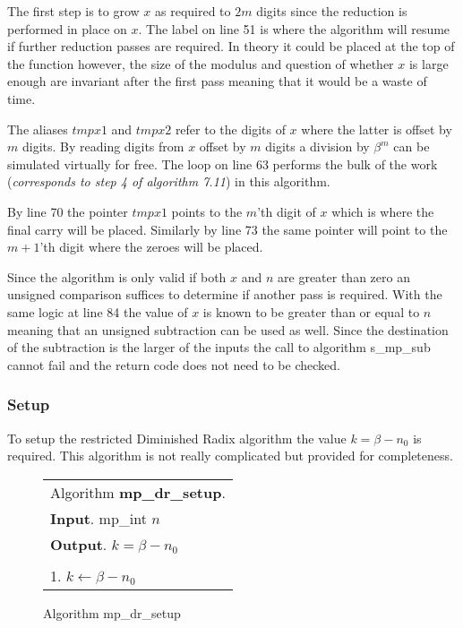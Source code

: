 \documentclass[b5paper]{book}
\begin{document}
The first step is to grow $x$ as required to $2m$ digits since the reduction is performed in place on $x$.  The label on line 51 is where
the algorithm will resume if further reduction passes are required.  In theory it could be placed at the top of the function however, the size of
the modulus and question of whether $x$ is large enough are invariant after the first pass meaning that it would be a waste of time.  

The aliases $tmpx1$ and $tmpx2$ refer to the digits of $x$ where the latter is offset by $m$ digits.  By reading digits from $x$ offset by $m$ digits
a division by $\beta^m$ can be simulated virtually for free.  The loop on line 63 performs the bulk of the work (\textit{corresponds to step 4 of algorithm 7.11})
in this algorithm.

By line 70 the pointer $tmpx1$ points to the $m$'th digit of $x$ which is where the final carry will be placed.  Similarly by line 73 the 
same pointer will point to the $m+1$'th digit where the zeroes will be placed.  

Since the algorithm is only valid if both $x$ and $n$ are greater than zero an unsigned comparison suffices to determine if another pass is required.  
With the same logic at line 84 the value of $x$ is known to be greater than or equal to $n$ meaning that an unsigned subtraction can be used
as well.  Since the destination of the subtraction is the larger of the inputs the call to algorithm s\_mp\_sub cannot fail and the return code
does not need to be checked.

\subsubsection{Setup}
To setup the restricted Diminished Radix algorithm the value $k = \beta - n_0$ is required.  This algorithm is not really complicated but provided for
completeness.

\begin{figure}[!here]
\begin{small}
\begin{center}
\begin{tabular}{l}
\hline Algorithm \textbf{mp\_dr\_setup}. \\
\textbf{Input}.   mp\_int $n$ \\
\textbf{Output}.  $k = \beta - n_0$ \\
\hline \\
1.  $k \leftarrow \beta - n_0$ \\
\hline
\end{tabular}
\end{center}
\end{small}
\caption{Algorithm mp\_dr\_setup}
\end{figure}
\end{document}
